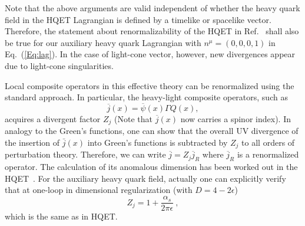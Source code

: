 Note that the above arguments are valid independent of whether the heavy quark field in the HQET Lagrangian is defined by a timelike or spacelike vector.
Therefore, the statement about renormalizability of the HQET in Ref.~\cite{Bagan:1993zv} shall also be
true for our auxiliary heavy quark Lagrangian with $n^\mu=(0,0,0,1)$ in Eq.~(\ref{Eq:lag}). In the case of light-cone vector, however,
new divergences appear due to light-cone singularities.

Local composite operators in this effective theory can be renormalized using the standard approach. In particular, the heavy-light composite operators, such as
\begin{equation}
             \overline{j}(x) = \overline{\psi}(x)\Gamma Q(x),
\end{equation}
acquires a divergent factor $Z_j$ (Note that $\overline{j}(x)$
now carries a spinor index). In analogy to the Green's functions, one can show that the overall UV divergence of the insertion of $\bar{j}(x)$ into Green's functions is subtracted by $Z_j$ to all orders of perturbation theory. Therefore, we can write $\overline{j}= Z_j \overline{j}_R$ where $\overline{j}_R$
is a renormalized operator.
 The calculation of its anomalous dimension
has been worked out in the HQET~\cite{Politzer:1988wp,Ji:1991pr}.
For the auxiliary heavy quark field, actually one can explicitly verify that at one-loop in dimensional regularization (with $D=4-2\epsilon$)
\begin{equation}\label{eq:hl}
   Z_j = 1+ \frac{\alpha_s}{2\pi\epsilon} \ ,
\end{equation}
which is the same as in HQET.
